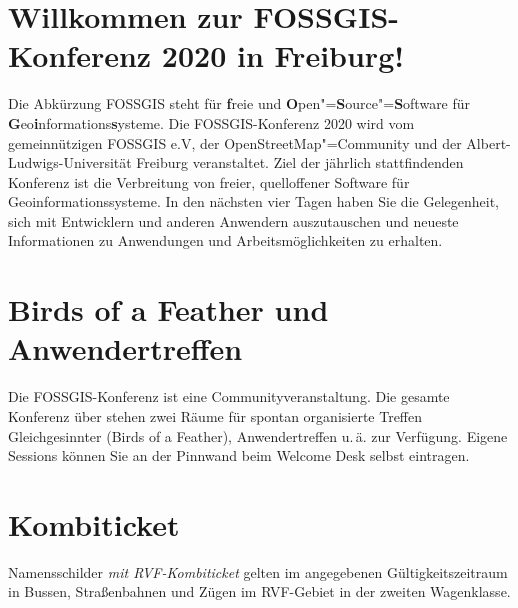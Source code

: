 \newpage
\section*{Willkommen zur FOSSGIS-Konferenz 2020 in Freiburg!} \label{welcome}
Die Abkürzung { FOSSGIS} steht für {\bfseries f}reie und {\bfseries O}pen"={\bfseries S}ource"={\bfseries S}oftware für {\bfseries G}eo{\bfseries i}nformations{\bfseries s}ysteme.
Die FOSSGIS-Konferenz 2020 wird vom gemeinnützigen FOSSGIS e.V, der
OpenStreetMap"=Community und der Albert-Ludwigs-Universität Freiburg
veranstaltet.
Ziel der jährlich stattfindenden Konferenz ist die Verbreitung von freier,
quelloffener Software für Geoinformationssysteme. In den nächsten vier Tagen
haben Sie die Gelegenheit, sich mit Entwicklern und anderen Anwendern
auszutauschen und \mbox{neueste} Informationen zu Anwendungen und
Arbeitsmöglichkeiten zu erhalten.

\section*{Birds of a Feather und Anwendertreffen}
Die FOSSGIS-Konferenz ist eine Communityveranstaltung.
Die gesamte Konferenz über stehen zwei Räume für spontan organisierte
Treffen Gleichgesinnter (Birds of a Feather), Anwendertreffen u.\,ä.
zur Verfügung. Eigene Sessions können Sie an der Pinnwand beim
Welcome Desk selbst eintragen.

\section*{Kombiticket}
Namensschilder \emph{mit RVF-Kombiticket} gelten im angegebenen Gültigkeitszeitraum in Bussen, Straßenbahnen und Zügen im RVF-Gebiet in der zweiten Wagenklasse.

\newpage

\newpage

\newpage

\newpage

\newpage

\newpage

